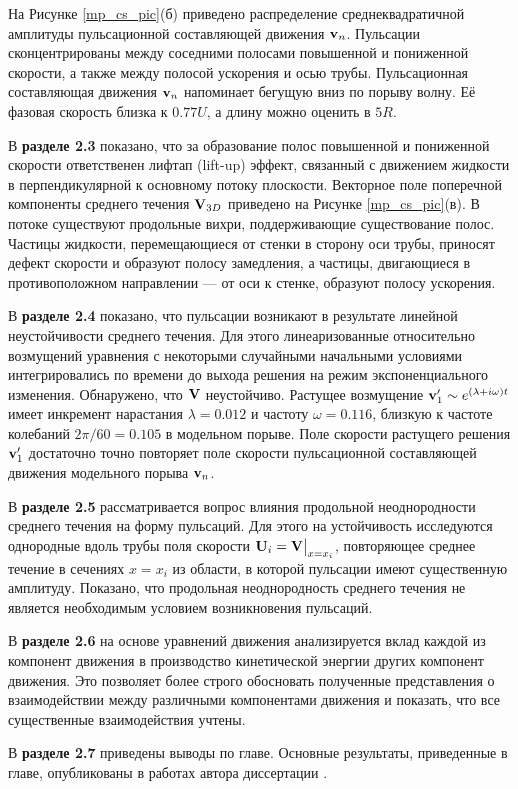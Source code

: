 На Рисунке \ref{mp_cs_pic}(б) приведено распределение среднеквадратичной амплитуды пульсационной составляющей движения $\mathbf{v}_n$. Пульсации сконцентрированы между соседними полосами повышенной и пониженной скорости, а также между полосой ускорения и осью трубы. Пульсационная составляющая движения $\mathbf{v}_n$ напоминает бегущую вниз по порыву волну. Её фазовая скорость близка к $0.77U$, а длину можно оценить в $5R$. 

В \textbf{разделе 2.3} показано, что за образование полос повышенной и пониженной скорости ответственен лифтап (lift-up) эффект, связанный с движением жидкости в перпендикулярной к основному потоку плоскости. 
Векторное поле поперечной компоненты среднего течения $\mathbf{V}_{3D}$ приведено на Рисунке \ref{mp_cs_pic}(в). В потоке существуют продольные вихри, поддерживающие существование полос. 
Частицы жидкости, перемещающиеся от стенки в сторону оси трубы, приносят дефект скорости и образуют полосу замедления, а частицы, двигающиеся в противоположном направлении --- от оси к стенке, образуют полосу ускорения.

В \textbf{разделе 2.4} показано, что пульсации возникают в результате линейной неустойчивости среднего течения. Для этого линеаризованные относительно возмущений уравнения с некоторыми случайными начальными условиями интегрировались по времени до выхода решения на режим экспоненциального изменения. Обнаружено, что $\mathbf{V}$ неустойчиво. Растущее возмущение $\mathbf{v}'_1 \sim e^{(\lambda+i\omega)t}$ имеет инкремент нарастания $\lambda=0.012$ и частоту $\omega=0.116$, близкую к частоте колебаний $2\pi/60=0.105$ в модельном порыве. Поле скорости растущего решения $\mathbf{v}'_1$ достаточно точно повторяет поле скорости пульсационной составляющей движения модельного порыва $\mathbf{v}_n$. 

В \textbf{разделе 2.5} рассматривается вопрос влияния продольной неоднородности среднего течения на форму пульсаций. Для этого на устойчивость исследуются однородные вдоль трубы поля скорости $\mathbf{U}_i = \mathbf{V}\big|_{x=x_i}$, повторяющее среднее течение в сечениях $x = x_i$ из области, в которой пульсации имеют существенную амплитуду. Показано, что продольная неоднородность среднего течения не является необходимым условием возникновения пульсаций. 

В \textbf{разделе 2.6} на основе уравнений движения анализируется вклад каждой из компонент движения в производство кинетической энергии других компонент движения. Это позволяет более строго обосновать полученные представления о взаимодействии между различными компонентами движения и показать, что все существенные взаимодействия учтены. %

В \textbf{разделе 2.7} приведены выводы по главе. Основные результаты, приведенные в главе, опубликованы в работах автора диссертации \cite{MZG2015, Kazan2015, KMU2014, KMU2015}.


